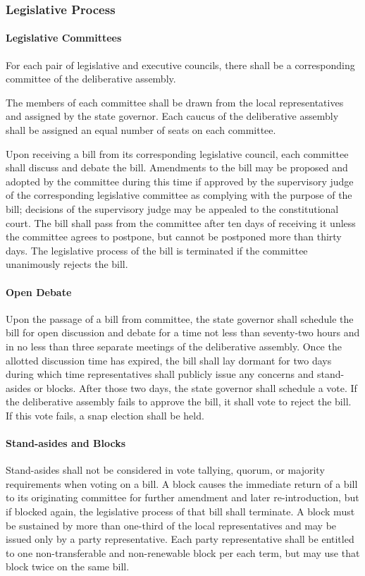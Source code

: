 \documentclass{article}
\begin{document}
\subsubsection{Legislative Process}
\paragraph{Legislative Committees}
For each pair of legislative and executive councils, there shall be a corresponding committee of the deliberative assembly.

The members of each committee shall be drawn from the local representatives and assigned by the state governor. Each caucus of the deliberative assembly shall be assigned an equal number of seats on each committee. 

Upon receiving a bill from its corresponding legislative council, each committee shall discuss and debate the bill. Amendments to the bill may be proposed and adopted by the committee during this time if approved by the supervisory judge of the corresponding legislative committee as complying with the purpose of the bill; decisions of the supervisory judge may be appealed to the constitutional court. The bill shall pass from the committee after ten days of receiving it unless the committee agrees to postpone, but cannot be postponed more than thirty days. The legislative process of the bill is terminated if the committee unanimously rejects the bill.
\paragraph{Open Debate}
Upon the passage of a bill from committee, the state governor shall schedule the bill for open discussion and debate for a time not less than seventy-two hours and in no less than three separate meetings of the deliberative assembly. Once the allotted discussion time has expired, the bill shall lay dormant for two days during which time representatives shall publicly issue any concerns and stand-asides or blocks. After those two days, the state governor shall schedule a vote. If the deliberative assembly fails to approve the bill, it shall vote to reject the bill. If this vote fails, a snap election shall be held.
\paragraph{Stand-asides and Blocks}
Stand-asides shall not be considered in vote tallying, quorum, or majority requirements when voting on a bill. A block causes the immediate return of a bill to its originating committee for further amendment and later re-introduction, but if blocked again, the legislative process of that bill shall terminate. A block must be sustained by more than one-third of the local representatives and may be issued only by a party representative. Each party representative shall be entitled to one non-transferable and non-renewable block per each term, but may use that block twice on the same bill.
\end{document}
